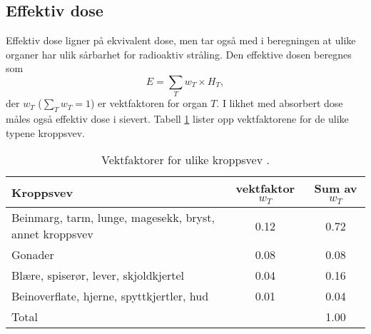 \subsection{Effektiv dose}
Effektiv dose ligner på ekvivalent dose, men tar også med i beregningen at ulike organer har ulik sårbarhet for radioaktiv stråling. Den effektive dosen beregnes som
\begin{equation}
	E = \sum_T w_T\times H_T,
\end{equation}
der $w_T$ ($\sum_T w_T = 1$) er vektfaktoren for organ $T$. I likhet med absorbert dose måles også effektiv dose i sievert. Tabell \ref{tab:radioaktiv:wT} lister opp vektfaktorene for de ulike typene kroppsvev.
\begin{table}[tp]
\begin{center}
{\footnotesize
	\begin{tabular}{lcc}
	\hline
	\hline
	Kroppsvev & vektfaktor $w_T$ & Sum av $w_T$ \\
	\hline
	Beinmarg, tarm, lunge, magesekk, bryst, annet kroppsvev & 0.12 & 0.72 \\
	Gonader & 0.08 & 0.08 \\
	Blære, spiserør, lever, skjoldkjertel & 0.04 & 0.16 \\
	Beinoverflate, hjerne, spyttkjertler, hud & 0.01 & 0.04 \\
	\hline
	Total && 1.00 \\
	\hline
	\hline
	\end{tabular}
}	
\end{center}
\caption{Vektfaktorer for ulike kroppsvev \cite{0952-4746-28-2-R02}.}
\label{tab:radioaktiv:wT}
\end{table}